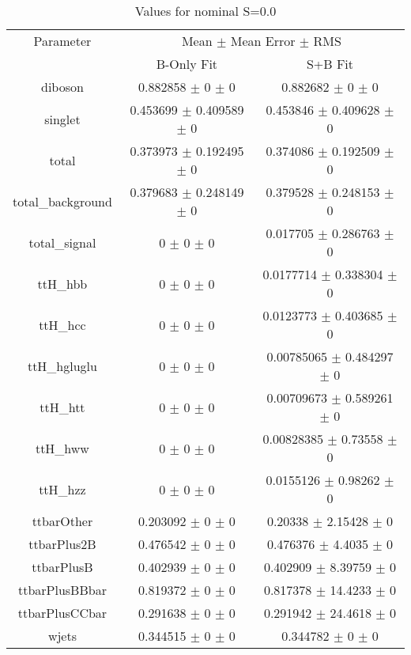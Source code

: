\begin{table}
\centering
\caption{Values for nominal S=0.0}
\begin{tabular}{ccc}
\toprule
Parameter & \multicolumn{2}{c}{Mean $\pm$ Mean Error $\pm$ RMS}\\
 & B-Only Fit & S+B Fit\\
\midrule
diboson & \num{0.882858} $\pm$ \num{0} $\pm$ \num{0} & \num{0.882682} $\pm$ \num{0} $\pm$ \num{0}\\
singlet & \num{0.453699} $\pm$ \num{0.409589} $\pm$ \num{0} & \num{0.453846} $\pm$ \num{0.409628} $\pm$ \num{0}\\
total & \num{0.373973} $\pm$ \num{0.192495} $\pm$ \num{0} & \num{0.374086} $\pm$ \num{0.192509} $\pm$ \num{0}\\
total\_background & \num{0.379683} $\pm$ \num{0.248149} $\pm$ \num{0} & \num{0.379528} $\pm$ \num{0.248153} $\pm$ \num{0}\\
total\_signal & \num{0} $\pm$ \num{0} $\pm$ \num{0} & \num{0.017705} $\pm$ \num{0.286763} $\pm$ \num{0}\\
ttH\_hbb & \num{0} $\pm$ \num{0} $\pm$ \num{0} & \num{0.0177714} $\pm$ \num{0.338304} $\pm$ \num{0}\\
ttH\_hcc & \num{0} $\pm$ \num{0} $\pm$ \num{0} & \num{0.0123773} $\pm$ \num{0.403685} $\pm$ \num{0}\\
ttH\_hgluglu & \num{0} $\pm$ \num{0} $\pm$ \num{0} & \num{0.00785065} $\pm$ \num{0.484297} $\pm$ \num{0}\\
ttH\_htt & \num{0} $\pm$ \num{0} $\pm$ \num{0} & \num{0.00709673} $\pm$ \num{0.589261} $\pm$ \num{0}\\
ttH\_hww & \num{0} $\pm$ \num{0} $\pm$ \num{0} & \num{0.00828385} $\pm$ \num{0.73558} $\pm$ \num{0}\\
ttH\_hzz & \num{0} $\pm$ \num{0} $\pm$ \num{0} & \num{0.0155126} $\pm$ \num{0.98262} $\pm$ \num{0}\\
ttbarOther & \num{0.203092} $\pm$ \num{0} $\pm$ \num{0} & \num{0.20338} $\pm$ \num{2.15428} $\pm$ \num{0}\\
ttbarPlus2B & \num{0.476542} $\pm$ \num{0} $\pm$ \num{0} & \num{0.476376} $\pm$ \num{4.4035} $\pm$ \num{0}\\
ttbarPlusB & \num{0.402939} $\pm$ \num{0} $\pm$ \num{0} & \num{0.402909} $\pm$ \num{8.39759} $\pm$ \num{0}\\
ttbarPlusBBbar & \num{0.819372} $\pm$ \num{0} $\pm$ \num{0} & \num{0.817378} $\pm$ \num{14.4233} $\pm$ \num{0}\\
ttbarPlusCCbar & \num{0.291638} $\pm$ \num{0} $\pm$ \num{0} & \num{0.291942} $\pm$ \num{24.4618} $\pm$ \num{0}\\
wjets & \num{0.344515} $\pm$ \num{0} $\pm$ \num{0} & \num{0.344782} $\pm$ \num{0} $\pm$ \num{0}\\
\bottomrule
\end{tabular}
\end{table}